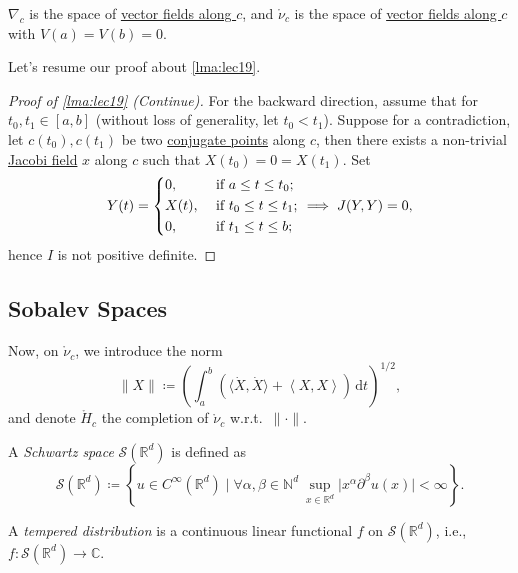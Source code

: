 \begin{prev}
	\(\nabla _c\) is the space of \hyperref[def:vector-field-along-curve]{vector fields along \(c\)}, and \(\mathring{\nu }_c\) is the space of \hyperref[def:vector-field-along-curve]{vector fields along \(c\)} with \(V(a) = V(b) = 0\).
\end{prev}

Let's resume our proof about \autoref{lma:lec19}.

\begin{proof}[Proof of \autoref{lma:lec19} (Continue)]
	For the backward direction, assume that for \(t_0, t_1\in [a, b]\) (without loss of generality, let \(t_0 < t_1\)). Suppose for a contradiction, let \(c(t_0), c(t_1)\) be two \hyperref[def:conjugate-point]{conjugate points} along \(c\), then there exists a non-trivial \hyperref[def:Jacobi-field]{Jacobi field} \(x\) along \(c\) such that \(X(t_0) = 0 = X(t_1)\). Set
	\[
		Y(t) = \begin{dcases}
			0,    & \text{ if } a \leq t \leq t_0 ;   \\
			X(t), & \text{ if } t_0 \leq t \leq t_1 ; \\
			0,    & \text{ if } t_1 \leq t \leq b;
		\end{dcases} \implies J(Y, Y) = 0,
	\]
	hence \(I\) is not positive definite.
\end{proof}

\subsection{Sobalev Spaces}
Now, on \(\mathring{\nu }_c\), we introduce the norm
\[
	\lVert X \rVert \coloneqq \left( \int_{a}^{b} \left( \langle \dot{X} , \dot{X} \rangle + \left\langle X, X \right\rangle  \right)  \,\mathrm{d}t \right) ^{1 / 2},
\]
and denote \(\mathring{H}_c\) the completion of \(\mathring{\nu}_c\) w.r.t.\ \(\lVert \cdot \rVert \).

\begin{definition}\label{def:Schwartz-space}
	A \emph{Schwartz space} \(\mathcal{S} (\mathbb{R} ^d)\) is defined as
	\[
		\mathcal{S} (\mathbb{R} ^d) \coloneqq \left\{ u\in C^{\infty} (\mathbb{R} ^d) \mid \forall \alpha , \beta \in \mathbb{N} ^d\ \sup _{x\in \mathbb{R} ^d} \vert x^\alpha \partial ^\beta u(x) \vert < \infty  \right\} .
	\]
\end{definition}

\begin{definition}\label{def:tempered-distribution}
	A \emph{tempered distribution} is a continuous linear functional \(f\) on \(\mathcal{S} (\mathbb{R} ^d)\), i.e., \(f\colon \mathcal{S} (\mathbb{R} ^d) \to \mathbb{C} \).
\end{definition}

